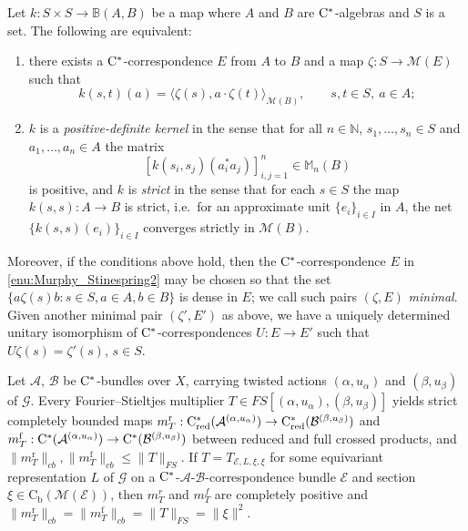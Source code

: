 \documentclass[10pt,a4paper]{amsart}
\newcommand{\A}{\mathcal A}
\newcommand{\B}{\mathcal B}
\newcommand{\BB}{\mathbb B}
\newcommand{\EE}{\mathcal E}
\newcommand{\G}{\mathcal G} %
\newcommand{\M}{\mathcal M}
\newcommand{\Mat}{\mathbb M} %
\newcommand{\N}{\mathbb N}
\newcommand*{\contb}{\mathrm{C_b}}%
\newcommand{\cst}{\ifmmode\mathrm{C}^*\else{$\mathrm{C}^*$}\fi}
\DeclareMathOperator{\f}{f}%
\newcommand{\m}{m}
\DeclareMathOperator{\rd}{r}%
\DeclareMathOperator{\red}{red}%
\begin{document}
\begin{cor}\label{cor:Murphy_Stinespring}
Let $k:S \times S \to \BB(A,B)$ be a map where $A$ and $B$ are $\cst$-algebras and $S$ is a set.
The following are equivalent:
\begin{enumerate}
    \item\label{enu:cor_Murphy_Stinespring2} there exists a $\cst$-correspondence $E$ from $A$ to $B$ and a map $\zeta:S \to \M(E)$ such that 
    \[
        k(s,t)(a) = \langle   \zeta(s), a\cdot \zeta(t) \rangle_{\M(B)}, \qquad s, t \in S,\ a \in A;
    \]

    \item\label{enu:cor_Murphy_Stinespring1} $k$ is a \emph{positive-definite kernel} in the sense that for all $n \in \N$, $s_1,\ldots, s_n \in S$ and $a_1, \ldots, a_n \in A$ the matrix
    \[
        [k(s_i,s_j) ( a_i^*a_j)]_{i,j=1}^n \in \Mat_n(B)
    \]
    is positive, %
    and $k$ is \emph{strict} in the sense that for each $s\in S$ the map $k(s,s):A\to B$ is strict, i.e.\ for an approximate unit $\{e_i\}_{i \in I}$ in $A$, the net $\{k(s,s)(e_i)\}_{i \in I}$ converges strictly in $\M(B)$.
\end{enumerate}
Moreover, if the conditions above hold, then the $\cst$-correspondence $E$ in \ref{enu:Murphy_Stinespring2} may be chosen so that the set $\{a\zeta(s)b:s \in S, a\in A, b\in B\}$ is dense in $E$; we call such pairs $(\zeta,E)$ \emph{minimal}. 
Given another minimal pair $(\zeta',E')$ as above, we have a uniquely determined unitary isomorphism of $\cst$-correspondences $U:E \to E'$ such that $U\zeta(s) = \zeta'(s)$, $s \in S$.
\end{cor}

\begin{thm}\label{thm:FSmultiplier_extends_to_reduced_and_full} 
Let $\A$, $\B$  be $\cst$-bundles over $X$, carrying twisted actions $(\alpha,u_\alpha)$ and $(\beta,u_\beta)$ of $\G$.
Every Fourier--Stieltjes multiplier $T\in FS[(\alpha,u_{\alpha}),(\beta,u_{\beta})]$ yields strict completely bounded maps $\m_T^{\rd} : \cst_{\red}(\A^{(\alpha,u_{\alpha})})\to \cst_{\red}(\B^{(\beta,u_{\beta})})$ and $\m_T^{\f} : \cst(\A^{(\alpha,u_{\alpha})})\to \cst(\B^{(\beta,u_{\beta})})$ between reduced and full crossed products, and $\|\m_T^{\rd}\|_{cb} , \|\m_T^{\f}\|_{cb} \leq \|T\|_{FS}$. 
If $T=T_{\EE,L,\xi,\xi}$ for some equivariant representation $L$ of $\G$ on a $\cst$-$\A$-$\B$-correspondence bundle $\EE$ and section $\xi \in \contb(\M(\EE))$, then $\m_T^{r}$ and $\m_T^{f}$ are completely positive and $\|\m_T^{\rd}\|_{cb} = \| \m_T^{\f} \|_{cb} = \| T \|_{FS} = \|\xi\|^2$.
\end{thm}
\end{document}

